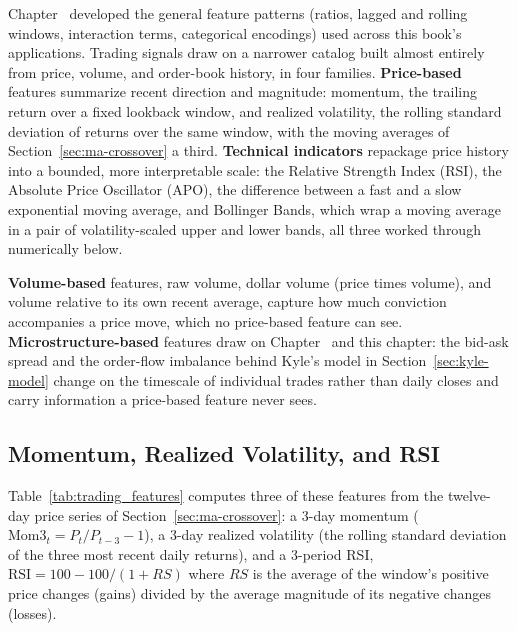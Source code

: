 \documentclass[../ai_in_finance]{subfiles}
\begin{document}
Chapter~ developed the general feature patterns (ratios, lagged and rolling windows, interaction terms, categorical encodings) used across this book's applications. Trading signals draw on a narrower catalog built almost entirely from price, volume, and order-book history, in four families. \textbf{Price-based} features summarize recent direction and magnitude: momentum, the trailing return over a fixed lookback window, and realized volatility, the rolling standard deviation of returns over the same window, with the moving averages of Section~\ref{sec:ma-crossover} a third. \textbf{Technical indicators} repackage price history into a bounded, more interpretable scale: the Relative Strength Index (RSI), the Absolute Price Oscillator (APO), the difference between a fast and a slow exponential moving average, and Bollinger Bands, which wrap a moving average in a pair of volatility-scaled upper and lower bands, all three worked through numerically below.

\textbf{Volume-based} features, raw volume, dollar volume (price times volume), and volume relative to its own recent average, capture how much conviction accompanies a price move, which no price-based feature can see. \textbf{Microstructure-based} features draw on Chapter~ and this chapter: the bid-ask spread and the order-flow imbalance behind Kyle's model in Section~\ref{sec:kyle-model} change on the timescale of individual trades rather than daily closes and carry information a price-based feature never sees.

\subsection{Momentum, Realized Volatility, and RSI}
\label{sec:momentum-rsi}

Table~\ref{tab:trading_features} computes three of these features from the twelve-day price series of Section~\ref{sec:ma-crossover}: a 3-day momentum ($\text{Mom3}_t = P_t/P_{t-3} - 1$), a 3-day realized volatility (the rolling standard deviation of the three most recent daily returns), and a 3-period RSI, $\text{RSI} = 100 - 100/(1+RS)$ where $RS$ is the average of the window's positive price changes (gains) divided by the average magnitude of its negative changes (losses).
\end{document}
